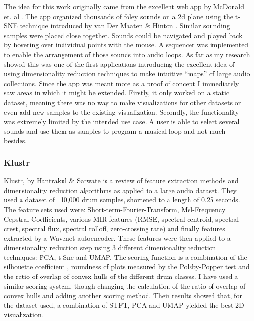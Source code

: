 \documentclass[11pt]{article}
\begin{document}
The idea for this work originally came from the excellent web app by McDonald et. al \cite{inf_drum_machine}. The app organized thousands of foley sounds on a 2d plane using the t-SNE technique introduced by van Der Maaten \& Hinton \cite{tsne}. Similar sounding samples were placed close together. Sounds could be navigated and played back by hovering over individual points with the mouse. A sequencer was implemented to enable the arrangement of those sounds into audio loops. As far as my research showed this was one of the first applications introducing the excellent idea of using dimensionality reduction techniques to make intuitive ``maps'' of large audio collections. Since the app was meant more as a proof of concept I immediately saw areas in which it might be extended. Firstly, it only worked on a static dataset, meaning there was no way to make visualizations for other datasets or even add new samples to the existing visualization. Secondly, the functionality was extremely limited by the intended use case. A user is able to select several sounds and use them as samples to program a musical loop and not much besides.
\subsubsection{Klustr}
\label{sec:org02aa748}

Klustr, by Hantrakul \& Sarwate \cite{klustr} is a review of feature extraction methods and dimensionality reduction algorithms as applied to a large audio dataset. They used a dataset of ~10,000 drum samples, shortened to a length of 0.25 seconds. The feature sets used were: Short-term-Fourier-Transform, Mel-Frequency Cepstral Coefficients, various MIR features (RMSE, spectral centroid, spectral crest, spectral flux, spectral rolloff, zero-crossing rate) and finally features extracted by a Wavenet autoencoder. These features were then applied to a dimensionality reduction step using 3 different dimenionality reduction techniques: PCA, t-Sne and UMAP. The scoring function is a combination of the silhouette coefficient \cite{silhouette}, roundness of plots measured by the Polsby-Popper test \cite{popper} and the ratio of overlap of convex hulls of the different drum classes. I have used a similar scoring system, though changing the calculation of the ratio of overlap of convex hulls and adding another scoring method. Their results showed that, for the dataset used, a combination of STFT, PCA and UMAP yielded the best 2D visualization.

\pagebreak
\end{document}
